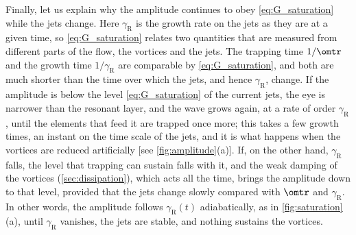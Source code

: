 Finally, let us explain why the amplitude continues to obey \cref{eq:G_saturation} while the jets change. Here \(\gamma_\text{R}\) is the growth rate on the jets as they are at a given time, so \cref{eq:G_saturation} relates two quantities that are measured from different parts of the flow, the vortices and the jets. The trapping time \(1/\omtr\) and the growth time \(1/\gamma_\text{R}\) are comparable by \cref{eq:G_saturation}, and both are much shorter than the time over which the jets, and hence \(\gamma_\text{R}\), change. If the amplitude is below the level \cref{eq:G_saturation} of the current jets, the eye is narrower than the resonant layer, and the wave grows again, at a rate of order \(\gamma_\text{R}\), until the elements that feed it are trapped once more; this takes a few growth times, an instant on the time scale of the jets, and it is what happens when the vortices are reduced artificially [see \cref{fig:amplitude}(a)]. If, on the other hand, \(\gamma_\text{R}\) falls, the level that trapping can sustain falls with it, and the weak damping of the vortices (\cref{sec:dissipation}), which acts all the time, brings the amplitude down to that level, provided that the jets change slowly compared with \(\omtr\) and \(\gamma_\text{R}\). In other words, the amplitude follows \(\gamma_\text{R}(t)\) adiabatically, as in \cref{fig:saturation}(a), until \(\gamma_\text{R}\) vanishes, the jets are stable, and nothing sustains the vortices.
